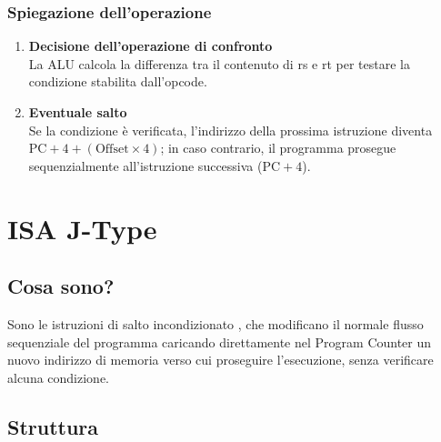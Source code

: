 \subsection{Spiegazione dell'operazione}
\begin{enumerate}
    \item \textbf{Decisione dell'operazione di confronto}\\
    La ALU calcola la differenza tra il contenuto di rs e rt per testare la condizione stabilita dall'opcode.

    \item \textbf{Eventuale salto}\\
    Se la condizione è verificata, l'indirizzo della prossima istruzione diventa $\text{PC} + 4 + (\text{Offset} \times 4)$; in caso contrario, il programma prosegue sequenzialmente all'istruzione successiva ($\text{PC} + 4$). 
\end{enumerate}

\chapter{ISA J-Type}

\section{Cosa sono?}
Sono le istruzioni di salto incondizionato , che modificano il normale flusso sequenziale del programma caricando direttamente nel Program Counter un nuovo indirizzo di memoria verso cui proseguire l'esecuzione, senza verificare alcuna condizione.

\section{Struttura}
